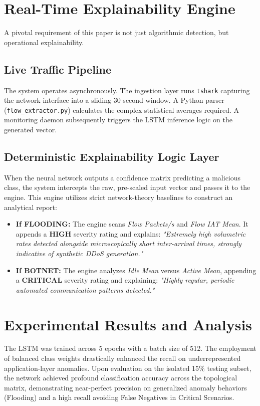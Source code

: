 \documentclass[conference]{IEEEtran}
\begin{document}
\section{Real-Time Explainability Engine}
A pivotal requirement of this paper is not just algorithmic detection, but operational explainability.

\subsection{Live Traffic Pipeline}
The system operates asynchronously. The ingestion layer runs \texttt{tshark} capturing the network interface into a sliding 30-second window. A Python parser (\texttt{flow\_extractor.py}) calculates the complex statistical averages required. A monitoring daemon subsequently triggers the LSTM inference logic on the generated vector.

\subsection{Deterministic Explainability Logic Layer}
When the neural network outputs a confidence matrix predicting a malicious class, the system intercepts the raw, pre-scaled input vector and passes it to the engine. This engine utilizes strict network-theory baselines to construct an analytical report:
\begin{itemize}
    \item \textbf{If FLOODING:} The engine scans \textit{Flow Packets/s} and \textit{Flow IAT Mean}. It appends a \textbf{HIGH} severity rating and explains: \textit{"Extremely high volumetric rates detected alongside microscopically short inter-arrival times, strongly indicative of synthetic DDoS generation."}
    \item \textbf{If BOTNET:} The engine analyzes \textit{Idle Mean} versus \textit{Active Mean}, appending a \textbf{CRITICAL} severity rating and explaining: \textit{"Highly regular, periodic automated communication patterns detected."}
\end{itemize}

\section{Experimental Results and Analysis}
The LSTM was trained across 5 epochs with a batch size of 512. The employment of balanced class weights drastically enhanced the recall on underrepresented application-layer anomalies. Upon evaluation on the isolated 15\% testing subset, the network achieved profound classification accuracy across the topological matrix, demonstrating near-perfect precision on generalized anomaly behaviors (Flooding) and a high recall avoiding False Negatives in Critical Scenarios.
\end{document}
